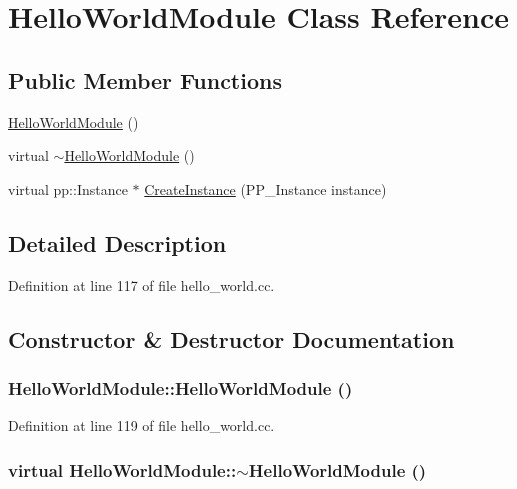 \hypertarget{class_hello_world_module}{
\section{HelloWorldModule Class Reference}
\label{class_hello_world_module}
}
\subsection*{Public Member Functions}
\begin{DoxyCompactItemize}
\item 
\hyperlink{class_hello_world_module_a51bebf2cbff1d8914b988101781bd01d}{HelloWorldModule} ()
\item 
virtual \hyperlink{class_hello_world_module_a2458f9ee6a26568e54c6bd3a0323abcf}{$\sim$HelloWorldModule} ()
\item 
virtual pp::Instance $\ast$ \hyperlink{class_hello_world_module_a6ee0eeeb3ed2f95b819adfd4df33c47f}{CreateInstance} (PP\_\-Instance instance)
\end{DoxyCompactItemize}


\subsection{Detailed Description}


Definition at line 117 of file hello\_\-world.cc.



\subsection{Constructor \& Destructor Documentation}
\hypertarget{class_hello_world_module_a51bebf2cbff1d8914b988101781bd01d}{
\subsubsection[{HelloWorldModule}]{\setlength{\rightskip}{0pt plus 5cm}HelloWorldModule::HelloWorldModule ()}}
\label{class_hello_world_module_a51bebf2cbff1d8914b988101781bd01d}


Definition at line 119 of file hello\_\-world.cc.

\hypertarget{class_hello_world_module_a2458f9ee6a26568e54c6bd3a0323abcf}{
\subsubsection[{$\sim$HelloWorldModule}]{\setlength{\rightskip}{0pt plus 5cm}virtual HelloWorldModule::$\sim$HelloWorldModule ()}}
\label{class_hello_world_module_a2458f9ee6a26568e54c6bd3a0323abcf}


